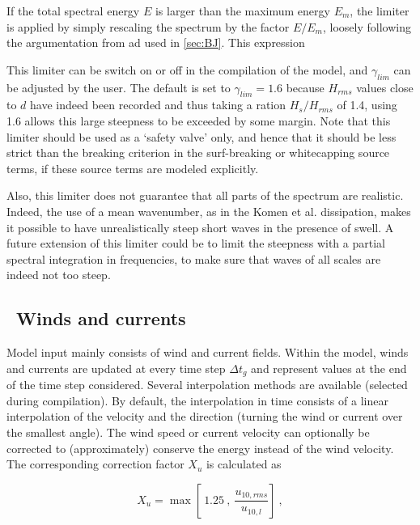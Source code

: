If the total spectral energy $E$ is larger than the
maximum energy $E_m$, the limiter is applied by simply rescaling the spectrum
by the factor $E/E_m$, loosely following the argumentation from
\cite{art:EB96} ad used in \para\ref{sec:BJ}. This expression 

This limiter can be switch on or off in the compilation of the model, and
$\gamma_{lim}$ can be adjusted by the user. The default is set to $\gamma_{lim} =
1.6$ because $H_{rms}$ values close to $d$ have indeed been recorded and thus taking a ration 
$H_s/H_{rms}$ of 1.4, using 1.6 allows this large steepness to be exceeded by some margin. 
Note that this limiter should be used as a `safety valve' only, and
hence that it should be less strict than the breaking criterion in the
surf-breaking or whitecapping source terms, if these source terms are modeled explicitly.

Also, this limiter does not guarantee that all parts of the spectrum are realistic. Indeed, 
the use of a mean wavenumber, as in the Komen et al. dissipation, makes it possible to have unrealistically steep 
short waves in the presence of swell. A future extension of this limiter could be to limit the steepness with a partial spectral integration 
in frequencies, to make sure that waves of all scales are indeed not too steep. 


\pb
\vssub
\subsection{~Winds and currents}
\vssub

\noindent
Model input mainly consists of wind and current fields. Within the model,
winds and currents are updated at every time step $\Delta t_g$ and represent
values at the end of the time step considered. Several interpolation methods
are available (selected during compilation). By default, the interpolation in
time consists of a linear interpolation of the velocity and the direction
(turning the wind or current over the smallest angle). The wind speed or
current velocity can optionally be corrected to (approximately) conserve the
energy instead of the wind velocity. The corresponding correction factor $X_u$
is calculated as


\begin{equation}
X_u = \max \left [ \: 1.25 \: , \: \frac{u_{10,rms}}{u_{10,l}}
\right ] \: , \label{eq:X_u10} \end{equation}

